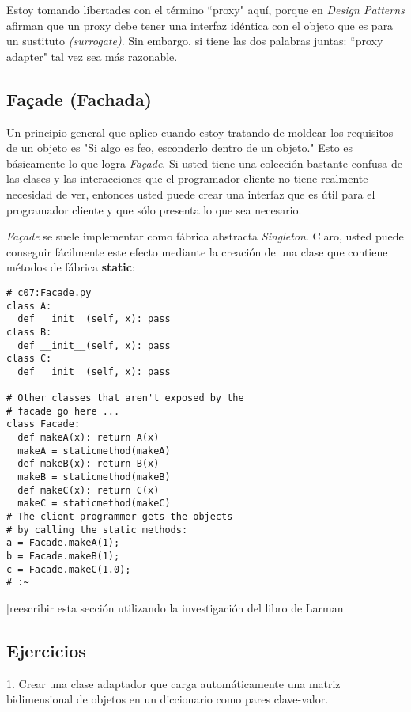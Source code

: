 Estoy tomando libertades con el término “proxy" aquí, porque en \textit{Design Patterns} afirman que un proxy debe tener una interfaz idéntica con el objeto que es para un sustituto \textit{(surrogate)}. Sin embargo, si tiene las dos palabras juntas: “proxy adapter" tal vez sea más razonable.  \newline

\subsection*{Façade (Fachada)}
\label{subsec:Fachada}

Un principio general que aplico cuando estoy tratando de moldear los requisitos de un objeto es "Si algo es feo, esconderlo dentro de un objeto." Esto es básicamente lo que logra \textit{Façade}. Si usted tiene una colección bastante confusa de las clases y las interacciones que el programador cliente no tiene realmente necesidad de ver, entonces usted puede crear una interfaz que es útil para el programador cliente y que sólo presenta lo que sea necesario.

\textit{Façade} se suele implementar como fábrica abstracta \textit{Singleton}. Claro, usted puede conseguir fácilmente este efecto mediante la creación de una clase que contiene métodos de fábrica \textbf{static}:  \newline

\begin{lstlisting} 
# c07:Facade.py 
class A: 
  def __init__(self, x): pass 
class B: 
  def __init__(self, x): pass 
class C: 
  def __init__(self, x): pass 
  
# Other classes that aren't exposed by the 
# facade go here ... 
class Facade: 
  def makeA(x): return A(x) 
  makeA = staticmethod(makeA) 
  def makeB(x): return B(x) 
  makeB = staticmethod(makeB) 
  def makeC(x): return C(x) 
  makeC = staticmethod(makeC) 
# The client programmer gets the objects 
# by calling the static methods: 
a = Facade.makeA(1); 
b = Facade.makeB(1); 
c = Facade.makeC(1.0); 
# :~ 
\end{lstlisting}
[reescribir esta sección utilizando la investigación del libro de Larman]   \newline

\subsection*{Ejercicios}
\label{subsec:Ejercicios10}


1. Crear una clase adaptador que carga automáticamente una matriz bidimensional de objetos en un diccionario como pares clave-valor.

\newpage